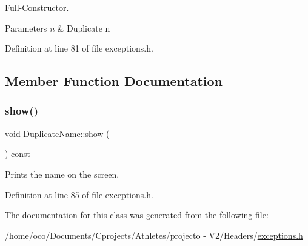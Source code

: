 Full-\/\+Constructor. 


\begin{DoxyParams}{Parameters}
{\em n} & Duplicate n \\
\hline
\end{DoxyParams}


Definition at line 81 of file exceptions.\+h.



\subsection{Member Function Documentation}
\hypertarget{class_duplicate_name_a65a60c94f9cf8d06e8fbf81559741d65}{}\label{class_duplicate_name_a65a60c94f9cf8d06e8fbf81559741d65} 
\subsubsection{\texorpdfstring{show()}{show()}}
{\footnotesize\ttfamily void Duplicate\+Name\+::show (\begin{DoxyParamCaption}{ }\end{DoxyParamCaption}) const\hspace{0.3cm}{\ttfamily [inline]}}



Prints the name on the screen. 



Definition at line 85 of file exceptions.\+h.



The documentation for this class was generated from the following file\+:\begin{DoxyCompactItemize}
\item 
/home/oco/\+Documents/\+Cprojects/\+Athletes/projecto -\/ V2/\+Headers/\hyperlink{exceptions_8h}{exceptions.\+h}\end{DoxyCompactItemize}
